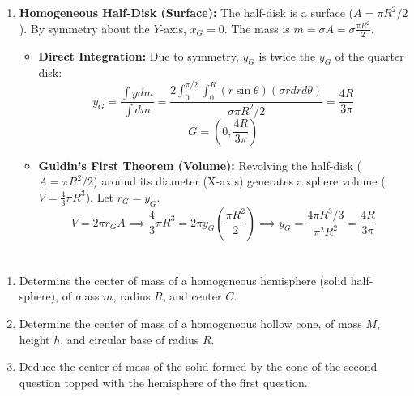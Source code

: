 \documentclass[12pt]{article}
\begin{document}
\begin{correctionbox}
\begin{enumerate}
\begin{itemize}
        \end{itemize}
    \item \textbf{Homogeneous Half-Disk (Surface):}
        The half-disk is a surface ($A=\pi R^2/2$). By symmetry about the $Y$-axis, $x_G=0$. The mass is $m=\sigma A = \sigma \frac{\pi R^2}{2}$.
        \begin{itemize}
            \item \textbf{Direct Integration:} Due to symmetry, $y_G$ is twice the $y_G$ of the quarter disk:
            $$y_G = \frac{\int y dm}{\int dm} = \frac{2 \int_0^{\pi/2}\int_0^R (r\sin\theta) (\sigma r dr d\theta)}{\sigma \pi R^2/2} = \frac{4R}{3\pi}$$
            $$G = \left(0, \frac{4R}{3\pi}\right)$$
            \item \textbf{Guldin's First Theorem (Volume):} Revolving the half-disk ($A=\pi R^2/2$) around its diameter (X-axis) generates a sphere volume ($V=\frac{4}{3}\pi R^3$). Let $r_G=y_G$.
            $$V = 2\pi r_G A \implies \frac{4}{3}\pi R^3 = 2\pi y_G \left(\frac{\pi R^2}{2}\right) \implies y_G = \frac{4\pi R^3/3}{\pi^2 R^2} = \frac{4R}{3\pi}$$
        \end{itemize}
\end{enumerate}

\end{correctionbox}

\section{}

\begin{enumerate}
    \item Determine the center of mass of a homogeneous hemisphere (solid half-sphere), of mass $m$, radius $R$, and center $C$.
    \item Determine the center of mass of a homogeneous hollow cone, of mass $M$, height $h$, and circular base of radius $R$.
    \item Deduce the center of mass of the solid formed by the cone of the second question topped with the hemisphere of the first question.
\end{enumerate}
\end{document}
